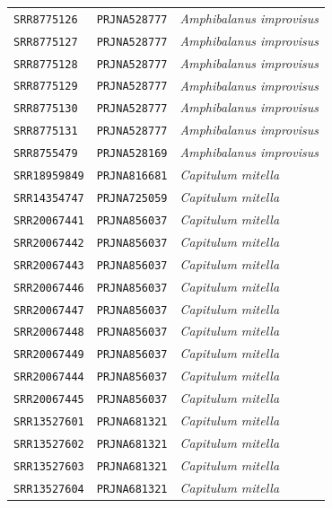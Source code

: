 \begin{table}[ht]
\begin{tabular}{lll}
            \texttt{SRR8775126}  & \texttt{PRJNA528777} & \textit{Amphibalanus improvisus} \\
            \texttt{SRR8775127}  & \texttt{PRJNA528777} & \textit{Amphibalanus improvisus} \\
            \texttt{SRR8775128}  & \texttt{PRJNA528777} & \textit{Amphibalanus improvisus} \\
            \texttt{SRR8775129}  & \texttt{PRJNA528777} & \textit{Amphibalanus improvisus} \\
            \texttt{SRR8775130}  & \texttt{PRJNA528777} & \textit{Amphibalanus improvisus} \\
            \texttt{SRR8775131}  & \texttt{PRJNA528777} & \textit{Amphibalanus improvisus} \\
            \texttt{SRR8755479}  & \texttt{PRJNA528169} & \textit{Amphibalanus improvisus} \\
            \texttt{SRR18959849} & \texttt{PRJNA816681} & \textit{Capitulum mitella} \\
            \texttt{SRR14354747} & \texttt{PRJNA725059} & \textit{Capitulum mitella} \\
            \texttt{SRR20067441} & \texttt{PRJNA856037} & \textit{Capitulum mitella} \\
            \texttt{SRR20067442} & \texttt{PRJNA856037} & \textit{Capitulum mitella} \\
            \texttt{SRR20067443} & \texttt{PRJNA856037} & \textit{Capitulum mitella} \\
            \texttt{SRR20067446} & \texttt{PRJNA856037} & \textit{Capitulum mitella} \\
            \texttt{SRR20067447} & \texttt{PRJNA856037} & \textit{Capitulum mitella} \\
            \texttt{SRR20067448} & \texttt{PRJNA856037} & \textit{Capitulum mitella} \\
            \texttt{SRR20067449} & \texttt{PRJNA856037} & \textit{Capitulum mitella} \\
            \texttt{SRR20067444} & \texttt{PRJNA856037} & \textit{Capitulum mitella} \\
            \texttt{SRR20067445} & \texttt{PRJNA856037} & \textit{Capitulum mitella} \\
            \texttt{SRR13527601} & \texttt{PRJNA681321} & \textit{Capitulum mitella} \\
            \texttt{SRR13527602} & \texttt{PRJNA681321} & \textit{Capitulum mitella} \\
            \texttt{SRR13527603} & \texttt{PRJNA681321} & \textit{Capitulum mitella} \\
            \texttt{SRR13527604} & \texttt{PRJNA681321} & \textit{Capitulum mitella} \\
        \bottomrule
    \end{tabular}
    \label{tab:sup_sra_data}
\end{table}

